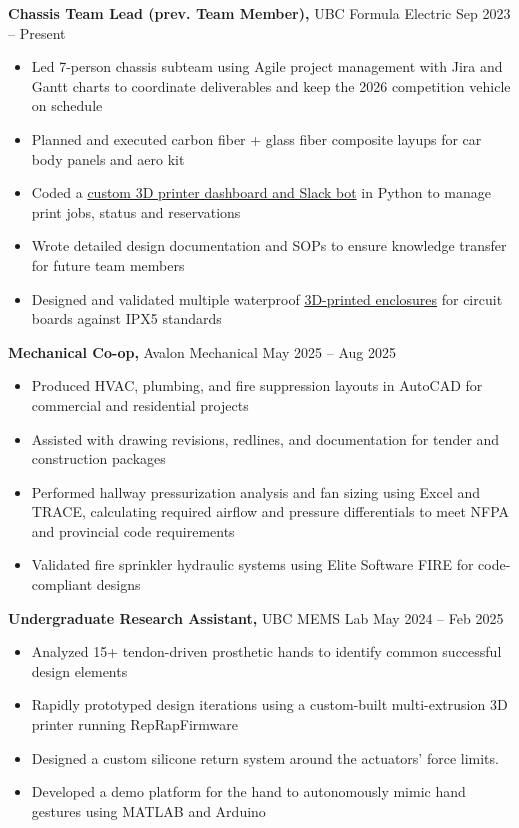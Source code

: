 \documentclass[11pt]{article}       %
\begin{document}
\textbf{Chassis Team Lead \textnormal{(prev. Team Member)},} {UBC Formula Electric} \hfill Sep 2023 -- Present \\
\vspace{-8.5pt}
\begin{itemize}
  \item Led 7-person chassis subteam using Agile project management with Jira and Gantt charts to coordinate deliverables and keep the 2026 competition vehicle on schedule
  \item Planned and executed carbon fiber + glass fiber composite layups for car body panels and aero kit
  \item Coded a \href{https://www.danielrbenjamin.com/projects/danbot/}{custom 3D printer dashboard and Slack bot} in Python to manage print jobs, status and reservations
  \item Wrote detailed design documentation and SOPs to ensure knowledge transfer for future team members
  \item Designed and validated multiple waterproof \href{https://www.danielrbenjamin.com/projects/circuit-enclosure/}{3D-printed enclosures} for circuit boards against IPX5 standards
\end{itemize}

\vspace{3pt}

\textbf{Mechanical Co-op,} {Avalon Mechanical} \hfill May 2025 -- Aug 2025 \\
\vspace{-8.5pt}
\begin{itemize}
  \item Produced HVAC, plumbing, and fire suppression layouts in AutoCAD for commercial and residential projects
  \item Assisted with drawing revisions, redlines, and documentation for tender and construction packages
  \item Performed hallway pressurization analysis and fan sizing using Excel and TRACE, calculating required airflow and pressure differentials to meet NFPA and provincial code requirements
  \item Validated fire sprinkler hydraulic systems using Elite Software FIRE for code-compliant designs
\end{itemize}

\vspace{3pt}

\textbf{Undergraduate Research Assistant,} {UBC MEMS Lab} \hfill May 2024 -- Feb 2025 \\
\vspace{-8.5pt}
\begin{itemize}
  \item Analyzed 15+ tendon-driven prosthetic hands to identify common successful design elements
  \item Rapidly prototyped design iterations using a custom-built multi-extrusion 3D printer running RepRapFirmware
  \item Designed a custom silicone return system around the actuators' force limits. 
  \item Developed a demo platform for the hand to autonomously mimic hand gestures using MATLAB and Arduino
\end{itemize}
\end{document}
